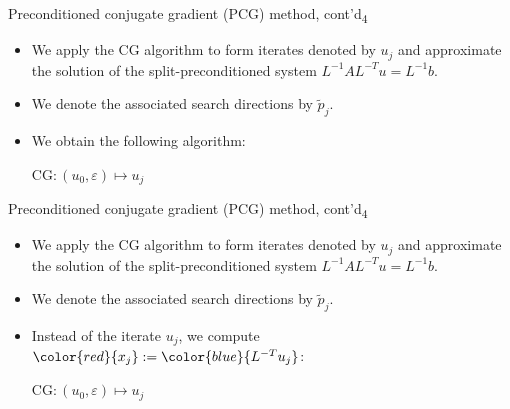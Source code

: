 \documentclass[t,usepdftitle=false]{beamer}
\begin{document}
\begin{frame}{Preconditioned conjugate gradient (PCG) method, cont'd\textsubscript{4}}
\begin{itemize}
\item We apply the CG algorithm to form iterates denoted by $u_j$ and approximate the solution of the split-preconditioned system $L^{-1}AL^{-T}u=L^{-1}b$.
\item[] We denote the associated search directions by $\tilde{p}_j$.
\item[] We obtain the following algorithm:
\vspace{-.25cm}
\begin{algorithm}[H]
\small
\caption{CG$:(u_0,\varepsilon)\mapsto u_j$}
\begin{algorithmic}[1]
\ENDFOR
\end{algorithmic}
\end{algorithm}
\end{itemize}
\end{frame}
\setcounter{framenumber}{7}
\begin{frame}{Preconditioned conjugate gradient (PCG) method, cont'd\textsubscript{4}}
\begin{itemize}
\item We apply the CG algorithm to form iterates denoted by $u_j$ and approximate the solution of the split-preconditioned system $L^{-1}AL^{-T}u=L^{-1}b$.
\item[] We denote the associated search directions by $\tilde{p}_j$.
\item[] Instead of the iterate $u_j$, we compute ${\color{red}{x_j}}:={\color{blue}{L^{-T}u_j}}$:
\vspace{-.25cm}
\setcounter{algorithm}{2}
\begin{algorithm}[H]
\small
\caption{CG$:(u_0,\varepsilon)\mapsto u_j$}
\begin{algorithmic}[1]
\ENDFOR
\end{algorithmic}
\end{algorithm}
\end{itemize}
\end{frame}
\end{document}

